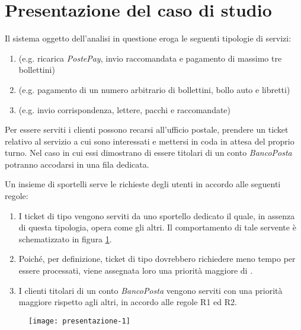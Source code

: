 \section{Presentazione del caso di studio}\label{sec:presentazione}
Il sistema oggetto dell'analisi in questione eroga le seguenti tipologie di servizi:
\begin{enumerate}
\item \uo{} (e.g. ricarica \textsl{PostePay}, invio raccomandata e pagamento di massimo tre bollettini)
\item \pp{} (e.g. pagamento di un numero arbitrario di bollettini, bollo auto e libretti)  
\item \sr{} (e.g. invio corrispondenza, lettere, pacchi e raccomandate)
\end{enumerate}

Per essere serviti i clienti possono recarsi all'ufficio postale, prendere un ticket relativo al servizio a cui sono interessati e mettersi in coda in attesa del proprio turno. Nel caso in cui essi dimostrano di essere titolari di un conto \textsl{BancoPosta} potranno accodarsi in una fila dedicata.

Un insieme di sportelli serve le richieste degli utenti in accordo alle seguenti regole: 
\begin{enumerate}[label=R\arabic*), align=left, leftmargin=*]
\item I ticket di tipo \sr{} vengono serviti da uno sportello dedicato il quale, in assenza di questa tipologia, opera come gli altri. Il comportamento di tale servente è schematizzato in figura \ref{fig:presentazione-1}. 
\item Poiché, per definizione, ticket di tipo \uo{} dovrebbero richiedere meno tempo per essere processati, viene assegnata loro una priorità maggiore di \pp{}.
\item I clienti titolari di un conto \textsl{BancoPosta} vengono serviti con una priorità maggiore rispetto agli altri, in accordo alle regole R1 ed R2.
\end{enumerate}

\begin{figure}[ht]
\centering
\texttt{[image: presentazione-1]}
\label{fig:presentazione-1}
\end{figure}
